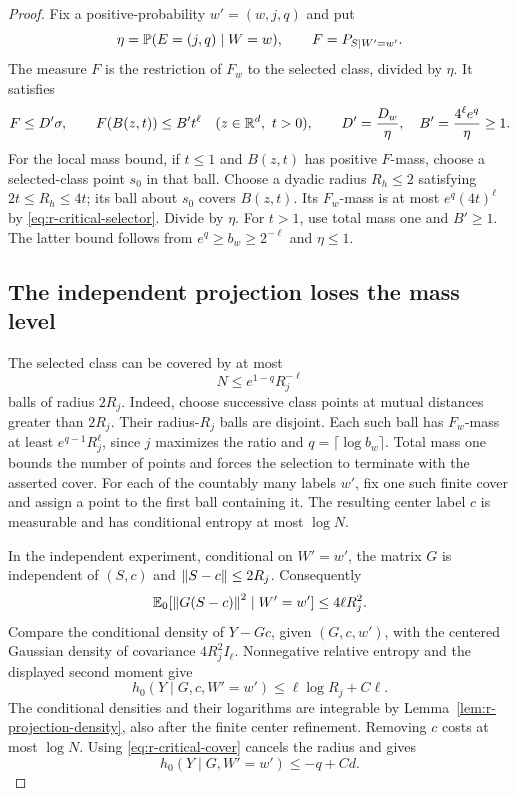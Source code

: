 \begin{proof}
Fix a positive-probability \(w'=(w,j,q)\) and put
\[
 \eta=\mathbb P(E=(j,q)\mid W=w),\qquad F=P_{S\mid W'=w'}.
\]
The measure \(F\) is the restriction of \(F_w\) to the selected
class, divided by \(\eta\).  It satisfies
\begin{equation}\label{eq:r-critical-growth}
 F\le D'\sigma,\qquad F(B(z,t))\le B't^\ell
 \quad(z\in\mathbb R^d,\ t>0),\qquad
 D'=\frac{D_w}{\eta},\quad B'=\frac{4^\ell e^q}{\eta}\ge1.
\end{equation}
For the local mass bound, if \(t\le1\) and \(B(z,t)\) has positive
\(F\)-mass, choose a selected-class point \(s_0\) in that ball.
Choose a dyadic radius \(R_h\le2\) satisfying
\(2t\le R_h\le4t\); its ball about \(s_0\) covers \(B(z,t)\).
Its \(F_w\)-mass is at
most \(e^q(4t)^\ell\) by \eqref{eq:r-critical-selector}.
Divide by \(\eta\).  For \(t>1\), use total mass one and
\(B'\ge1\).  The latter bound follows from
\(e^q\ge b_w\ge2^{-\ell}\) and \(\eta\le1\).

\subsection*{The independent projection loses the mass level}

The selected class can be covered by at most
\begin{equation}\label{eq:r-critical-cover}
 N\le e^{1-q}R_j^{-\ell}
\end{equation}
balls of radius \(2R_j\).  Indeed, choose successive class points
at mutual distances greater than \(2R_j\).  Their radius-\(R_j\)
balls are disjoint.  Each such ball has \(F_w\)-mass at least
\(e^{q-1}R_j^\ell\), since \(j\) maximizes the ratio and
\(q=\lceil\log b_w\rceil\).  Total mass one bounds the number
of points and forces the selection to terminate with the asserted
cover.  For each of the countably many labels \(w'\), fix one such
finite cover and assign a point to the first ball containing it.
The resulting center label \(c\) is measurable and has conditional
entropy at most \(\log N\).

In the independent experiment, conditional on \(W'=w'\), the
matrix \(G\) is independent of \((S,c)\) and
\(\left\lVert S-c\right\rVert\le2R_j\).  Consequently
\[
 \mathbb E_0[\left\lVert G(S-c)\right\rVert^2\mid W'=w']\le4\ell R_j^2.
\]
Compare the conditional density of \(Y-Gc\), given \((G,c,w')\),
with the centered Gaussian density of covariance \(4R_j^2I_\ell\).
Nonnegative relative entropy and the displayed second moment give
\[
 h_0(Y\mid G,c,W'=w')\le\ell\log R_j+C\ell.
\]
The conditional densities and their logarithms are integrable by
Lemma~\ref{lem:r-projection-density}, also after the finite center
refinement.  Removing \(c\) costs at most \(\log N\).  Using
\eqref{eq:r-critical-cover} cancels the radius and gives
\begin{equation}\label{eq:r-critical-independent-entropy}
 h_0(Y\mid G,W'=w')\le-q+Cd.
\end{equation}


\end{proof}
